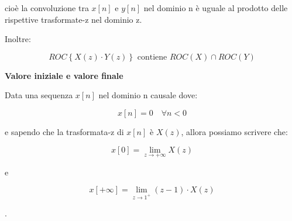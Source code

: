 cioè la convoluzione tra $x \left[ n\right]$ e $y \left[ n\right]$ nel dominio n è uguale al prodotto delle rispettive trasformate-z nel dominio z. \newline 

Inoltre: 

{
    \Large 
    \begin{equation}
        ROC \left\{ X \left(z \right) \cdot Y \left( z\right) \right\} 
        \text{ contiene }
        ROC \left(X\right) \cap ROC \left( Y\right)
    \end{equation}
}

\textbf{Valore iniziale e valore finale} \newline 

Data una sequenza $x \left[  n \right]$ nel dominio n causale dove: 

{
    \Large 
    \begin{equation}
        x \left[ n\right] 
        = 
        0 
        \quad
        \forall n < 0
    \end{equation}
}

e sapendo che la trasformata-z di $x \left[ n\right]$ è $X \left(z \right) $, 
allora possiamo scrivere che: 

{
    \Large 
    \begin{equation}
        x \left[ 0\right]
        = 
        \lim_{z \to + \infty} X \left(z\right)
    \end{equation}
}

e 

{
    \Large 
    \begin{equation}
        x \left[ + \infty \right]
        = 
        \lim_{z \to 1^{+}} \left( z - 1\right) \cdot X \left(z\right)
    \end{equation}
}

\newpage 
. 

\newpage 


